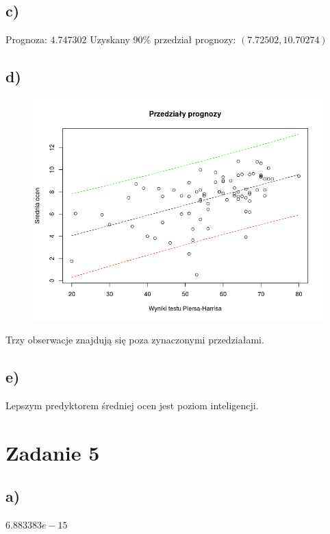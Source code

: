 \documentclass[9pt]{article}  %
\begin{document}
  \subsection{c)}
    Prognoza: $4.747302$ \newline
    Uzyskany 90\% przedział prognozy: $\left( 7.72502, 10.70274 \right)$



  \subsection{d)}
    \begin{figure}[H]
      \centering
      \includegraphics[width=1\textwidth]{3d.png}
      \caption {}
    \end{figure} 
    Trzy obserwacje znajdują się poza zynaczonymi przedziałami.
  
  \subsection{e)}
  
    Lepszym predyktorem średniej ocen jest poziom inteligencji.


\section{Zadanie 5}

  \subsection{a)}
  $6.883383e-15$
\end{document}
